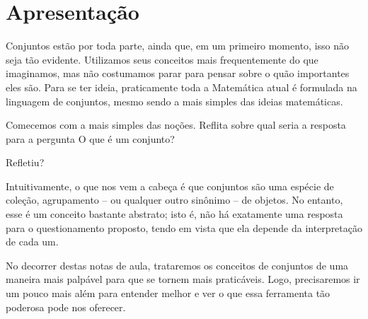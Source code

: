 \section{Apresentação}

Conjuntos estão por toda parte, ainda que, em um primeiro momento, isso não seja tão evidente. Utilizamos seus conceitos mais frequentemente do que imaginamos, mas não costumamos parar para pensar sobre o quão importantes eles são.
Para se ter ideia, praticamente toda a Matemática atual é formulada na linguagem de conjuntos, mesmo sendo a mais simples das ideias matemáticas.

Comecemos com a mais simples das noções. Reflita sobre qual seria a resposta para a pergunta \abreaspas O que é um conjunto?\fechaaspas

\reticencias Refletiu?

Intuitivamente, o que nos vem a cabeça é que conjuntos são uma espécie de coleção, agrupamento -- ou qualquer outro sinônimo -- de objetos.
No entanto, esse é um conceito bastante abstrato; isto é, não há exatamente uma resposta para o questionamento proposto, tendo em vista que ela depende da interpretação de cada um.

No decorrer destas notas de aula, trataremos os conceitos de conjuntos de uma maneira mais palpável para que se tornem mais praticáveis.
Logo, precisaremos ir um pouco mais além para entender melhor e ver o que essa ferramenta tão poderosa pode nos oferecer.
